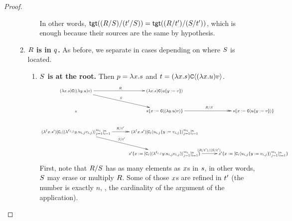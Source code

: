 \begin{proof}
\begin{enumerate}
\begin{enumerate}
\begin{enumerate}
            In other words, $\mathsf{tgt}((R / S) / (t' / S)) =
                             \mathsf{tgt}((R / t') / (S / t'))$, which is enough because their sources
                             are the same by hypothesis.
        \end{enumerate}
      \item {\bf $R$ is in $q$.} As before, we separate in cases depending on where $S$ is located.
        \begin{enumerate}
          \item {\bf $S$ is at the root.} Then $p = \lambda x. s$
            and $t = (\lambda x. s) \mathtt{C}\langle(\lambda x. u) v\rangle$.
            \[
            {\footnotesize
            \xymatrix@C=1cm{
              (\lam{\var}{\tmtwo}) \conof{(\lam{\vartwo}{\tmthree}) \tmthreevariant}
                \ar@{->}[r]^{\redex} \ar@{->}[rd]^{\redextwo} \ar@{}[dd]|*=0[@]{\rtimes}
                  & (\lam{\var}{\tmtwo}) \conof{\subs{\tmthree}{\vartwo}{\tmthreevariant}} & \\
                & \subs{\tmtwo}{\var}{\conof{(\lam{\vartwo}{\tmthree}) \tmthreevariant}}
                  \ar@{->>}[r]^{\redex / \redextwo}
                    & \subs{\tmtwo}{\var}{\conof{\subs{\tmthree}{\vartwo}{\tmthreevariant}}} \\
                \ar@{->>}[r]^{\redex / \tm'} \ar@{->}[rd]^{\redextwo / \tm'}
              (\lamp{\lab}{\var}{\tmtwo'}) [\con_i\of{(\lamp{\lab_{i,j}}{\vartwo}{\tmthree_{i,j}} \tmthreevariant_{i,j})}_{j=1}^{m_i}]_{i=1}^n
                  & (\lamp{\lab}{\var}{\tmtwo'}) [\con_i\of{\subs{\tmthree_{i,j}}{\vartwo}{\tmthreevariant_{i,j}}}_{j=1}^{m_i}]_{i=1}^n & \\
                & \subs{\tmtwo'}{\var}{[\con_i\of{(\lamp{\lab_{i,j}}{\vartwo}{\tmthree_{i,j}} \tmthreevariant_{i,j})}_{j=1}^{m_i}]_{i=1}^n} \ar@{->}[r]^{(\redex / \tm') / (\redextwo / \tm')}
                  & \subs{\tmtwo'}{\var}{[\con_i\of{\subs{\tmthree_{i,j}}{\vartwo}{\tmthreevariant_{i,j}}}_{j=1}^{m_i}]_{i=1}^n}
              }
            }
            \]
            First, note that $R / S$ has as many elements as $x$s in $s$, in other words,
            $S$ may erase or multiply $R$.
            Some of those $x$s are refined in $t'$ (the number is exactly $n$,
            \ie, the cardinality of the argument of the application).


\end{enumerate}
\end{enumerate}
\end{enumerate}
\end{proof}
